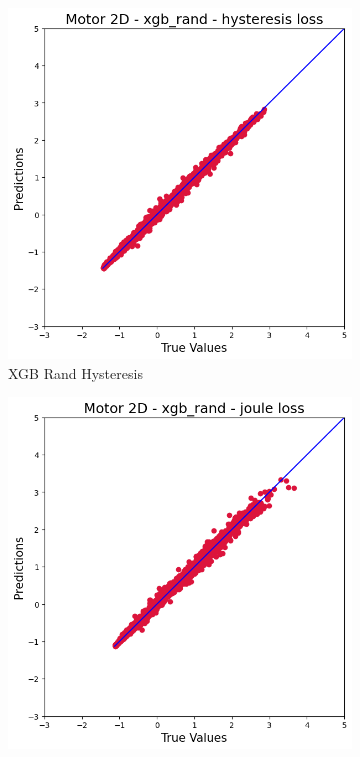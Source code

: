 \documentclass{article}
\begin{document}
\begin{figure}[!htbp]
    \vspace{0.3cm}
    
    \begin{subfigure}[b]{0.23\textwidth}
        \centering
        \null
    \end{subfigure}
    \hfill
    \centering
    \begin{subfigure}[b]{0.23\textwidth}
        \centering
        \includegraphics[width=\textwidth]{images/2D/xgb_rand_hysteresis.png}
        \caption{XGB Rand Hysteresis}
    \end{subfigure}
    \hfill
    \begin{subfigure}[b]{0.23\textwidth}
        \centering
        \includegraphics[width=\textwidth]{images/2D/xgb_rand_joule.png}

\end{subfigure}
\end{figure}
\end{document}
